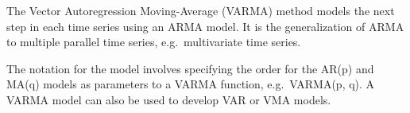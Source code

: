 The Vector Autoregression Moving-Average (VARMA) method models the next
step in each time series using an ARMA model. It is the generalization
of ARMA to multiple parallel time series, e.g.~multivariate time series.

The notation for the model involves specifying the order for the AR(p)
and MA(q) models as parameters to a VARMA function, e.g.~VARMA(p, q). A
VARMA model can also be used to develop VAR or VMA models.

%


